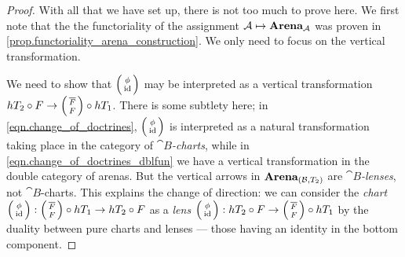 \documentclass[DynamicalBook]{subfiles}
\begin{document}
\begin{proof}
  With all that we have set up, there is not too much to prove here. We first
  note that the the functoriality of the assignment $\mathcal{A} \mapsto
  \textbf{Arena}_{\mathcal{A}}$ was proven in
  \cref{prop.functoriality_arena_construction}. We only need to focus on the
  vertical transformation.

  We need to
show that $\lens{\phi}{\id}$ may be interpreted as a vertical transformation
$hT_2 \circ F \to \lens{\overline{F}}{F} \circ hT_1$. There is some subtlety
here; in \cref{eqn.change_of_doctrines}, $\lens{\phi}{\id}$ is interpreted as a
natural transformation taking place in the category of \emph{$\cat{B}$-charts}, while in
\cref{eqn.change_of_doctrines_dblfun} we have a vertical transformation in the
double category of arenas. But the vertical arrows in $\textbf{Arena}_{(\mathcal{B},
  T_2)}$ are \emph{$\cat{B}$-lenses}, not $\cat{B}$-charts. This explains the
change of direction: we can consider the \emph{chart} $\lens{\phi}{\id} :\lens{\overline{F}}{F} \circ hT_1  \to  hT_2
\circ F$ as a \emph{lens}
$\lens{\phi}{\id} : hT_2 \circ F \to \lens{\overline{F}}{F} \circ hT_1$ by the
duality between pure charts and lenses --- those having an identity in the
bottom component.


\end{proof}
\end{document}
